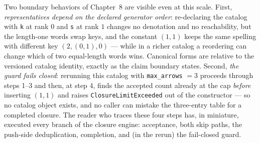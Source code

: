 Two boundary behaviors of Chapter~8 are visible even at this scale.
First, \emph{representatives depend on the declared generator order}:
re-declaring the catalog with \texttt{k} at rank $0$ and \texttt{s} at
rank $1$ changes no denotation and no reachability, but the length-one
words swap keys, and the constant $(1,1)$ keeps the same spelling with
different key $(2,(0,1),0)$ --- while in a richer catalog a
reordering can change which of two equal-length words wins. Canonical
forms are relative to the versioned catalog identity, exactly as the
claim boundary states. Second, \emph{the guard fails closed}: rerunning
this catalog with \texttt{max\_arrows} $= 3$ proceeds through steps
1--3 and then, at step 4, finds the accepted count already at the cap
\emph{before} inserting $(1,1)$ and raises
\texttt{ClosureLimitExceeded} out of the constructor --- so no catalog
object exists, and no caller can mistake the three-entry table for a
completed closure. The reader who traces these four steps has, in
miniature, executed every branch of the closure engine: acceptance,
both skip paths, the push-side deduplication, completion, and (in the
rerun) the fail-closed guard.
